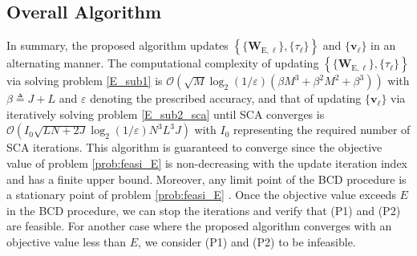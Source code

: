 \documentclass[12pt,draftclsnofoot, onecolumn]{IEEEtran}
\theoremstyle{plain}
\begin{document}
\begin{sloppypar}
\subsection{Overall Algorithm}
In summary, the proposed algorithm updates $\left\lbrace \{\mathbf W_{\mathrm E,\ell}\}, \{\tau_\ell\} \right\rbrace$ and $\{\mathbf v_\ell\}$ in an alternating manner. The computational complexity of updating $\left\lbrace \{\mathbf W_{\mathrm E,\ell}\}, \{\tau_\ell\} \right\rbrace$ via solving problem \eqref{E_sub1} is $\mathcal O\left(\sqrt{M}\log_2\left({1}/{\varepsilon}\right)\left(\beta M^3 + \beta^2 M^2 + \beta^3\right)\right)$ \cite{2010_Imre_SDR_complexity} with $\beta \triangleq J + L$ and $\varepsilon$ denoting the prescribed accuracy, and that of updating $\{\mathbf v_\ell\}$ via iteratively solving problem \eqref{E_sub2_sca} until SCA converges is $\mathcal O\left(I_0\sqrt{LN + 2J}\log_2\left({1}/{\varepsilon}\right)N^3L^3J \right)$ \cite{2014_K.wang_complexity} with $I_0$ representing the required number of SCA iterations. This algorithm is guaranteed to converge since the objective value of problem \eqref{prob:feasi_E} is non-decreasing with the update iteration index and has a finite upper bound. Moreover, any limit point of the BCD procedure is a stationary point of problem \eqref{prob:feasi_E} \cite{2001_Tseng_BCD}. Once the objective value exceeds $E$ in the BCD procedure, we can stop the iterations and verify that (P1) and (P2) are feasible. For another case where the proposed algorithm converges with an objective value less than $E$, we consider (P1) and (P2) to be infeasible. 
 

\end{sloppypar}
\end{document}
